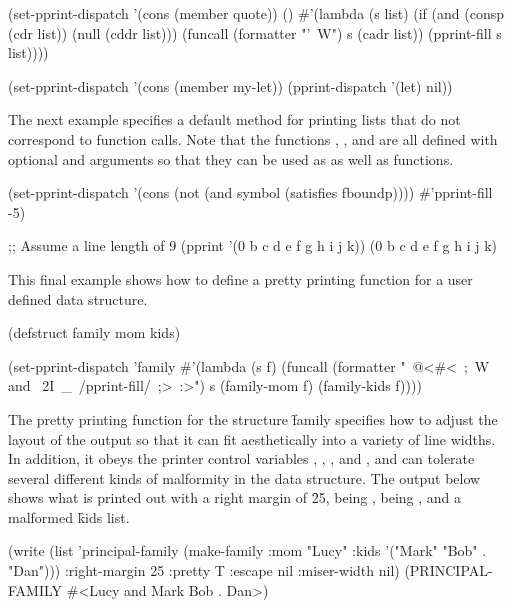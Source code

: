 \code
 (set-pprint-dispatch '(cons (member quote)) () 
   #'(lambda (s list)
       (if (and (consp (cdr list)) (null (cddr list)))
          (funcall (formatter "'~W") s (cadr list))
          (pprint-fill s list))))
 
 (set-pprint-dispatch '(cons (member my-let)) 
                      (pprint-dispatch '(let) nil))
\endcode
 
The next example specifies a default method for printing lists that do not
correspond to function calls.  Note that the functions ,
, and  are all defined with
optional  and  arguments so that they can 
be used as  as well as  
functions.

\code
 (set-pprint-dispatch '(cons (not (and symbol (satisfies fboundp))))
                      #'pprint-fill -5)
 
 ;; Assume a line length of 9
 (pprint '(0 b c d e f g h i j k))
 (0 b c d
  e f g h
  i j k)
\endcode 

This final example shows how to define a pretty printing function for a
user defined data structure.
 
\code
 (defstruct family mom kids)
 
 (set-pprint-dispatch 'family
   #'(lambda (s f)
       (funcall (formatter "~@<#<~;~W and ~2I~_~/pprint-fill/~;>~:>")
               s (family-mom f) (family-kids f))))
\endcode
 
The pretty printing function for the structure \f{family} specifies how to
adjust the layout of the output so that it can fit aesthetically into
a variety of line widths.  In addition, it obeys 
the printer control variables ,
, ,
and ,
and can tolerate several different kinds of malformity in the data structure.
The output below shows what is printed out with a right margin of \f{25},
 being ,  being ,
and a malformed \f{kids} list.
 
\code
 (write (list 'principal-family
              (make-family :mom "Lucy"
                           :kids '("Mark" "Bob" . "Dan")))
        :right-margin 25 :pretty T :escape nil :miser-width nil)
 (PRINCIPAL-FAMILY
  #<Lucy and
      Mark Bob . Dan>)
\endcode
  
